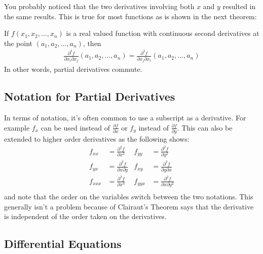You probably noticed that the two derivatives involving both $x$ and $y$ resulted in the same results.  This is true for most functions as is shown in the next theorem:
%
\begin{theorem}
If $f(x_1, x_2, \ldots, x_n)$ is a real valued function with continuous second derivatives at the point $(a_1, a_2, \ldots, a_n)$, then
%
\begin{align*}
\frac{\partial^2 f}{\partial x_i \partial x_j}(a_1,a_2, \ldots, a_n) = \frac{\partial^2 f}{\partial x_j \partial x_i} (a_1,a_2,\ldots, a_n)
\end{align*}
In other words, partial derivatives commute.
\end{theorem}



\subsection{Notation for Partial Derivatives}

In terms of notation, it's often common to use a subscript as a derivative.  For example $f_x$ can be used instead of $\frac{\partial f}{\partial x}$ or $f_y$ instead of $\frac{\partial f}{\partial y}$.  This can also be extended to higher order derivatives as the following shows:
%
\begin{align*}
f_{xx} & = \frac{\partial^2 f}{\partial x^2} & f_{yy} & = \frac{\partial^2 f}{\partial y^2} \\
f_{yx} & = \frac{\partial^2 f}{\partial x \partial y} & f_{xy} & = \frac{\partial^2 f}{\partial y \partial x} \\
f_{xxx} & = \frac{\partial^3 f}{\partial x^3} & f_{yyx} & = \frac{\partial^2 f}{\partial x\partial y^2} \\
\end{align*}
%
and note that the order on the variables switch between the two notations.  This generally isn't a problem because of Clairaut's Theorem says that the derivative is independent of the order taken on the derivatives.



\subsection{Differential Equations}







